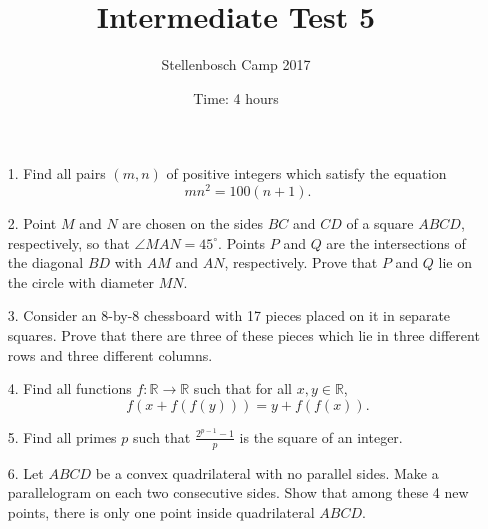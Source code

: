 \documentclass[12pt]{article}
\title{Intermediate Test 5}
\author{Stellenbosch Camp 2017}
\date{Time: 4 hours}
\begin{document}
 \maketitle

\begin{enumerate}

\item[1.] %
Find all pairs $(m,n)$ of positive integers which satisfy the equation
  \[ mn^2 = 100(n+1). \]


\item[2.] %
Point $M$ and $N$ are chosen on the sides $BC$ and $CD$ of a square $ABCD$, respectively, so that $\angle MAN = 45^\circ$. Points $P$ and $Q$ are the intersections of the diagonal $BD$ with $AM$ and $AN$, respectively. Prove that $P$ and $Q$ lie on the circle with diameter $MN$.


\item[3.] %
Consider an 8-by-8 chessboard with 17 pieces placed on it in separate squares. Prove that there are three of these pieces which lie in three different rows and three different columns.


\item[4.] %
Find all functions $f: \mathbb{R} \to \mathbb{R}$ such that for all $x,y \in \mathbb{R}$,
  \[ f(x+f(f(y))) = y+f(f(x)). \]


\item[5.] %
Find all primes $p$ such that $\displaystyle \frac{2^{p-1}-1}{p}$ is the square of an integer.
 

\item[6.] %
Let $ABCD$ be a convex quadrilateral with no parallel sides. Make a parallelogram on each two consecutive sides. Show that among these 4 new points, there is only one point inside quadrilateral $ABCD$.


\end{enumerate}

\vfill

\centering
\begin{BVerbatim}
\end{BVerbatim}
\end{document}
